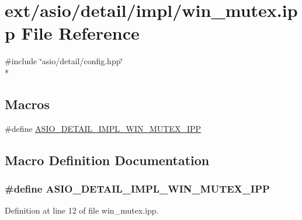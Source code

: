 \hypertarget{win__mutex_8ipp}{}\section{ext/asio/detail/impl/win\+\_\+mutex.ipp File Reference}
\label{win__mutex_8ipp}
{\ttfamily \#include \char`\"{}asio/detail/config.\+hpp\char`\"{}}\\*
\subsection*{Macros}
\begin{DoxyCompactItemize}
\item 
\#define \hyperlink{win__mutex_8ipp_afff9debcf1cfaa5cec0a749e4d0e3d02}{A\+S\+I\+O\+\_\+\+D\+E\+T\+A\+I\+L\+\_\+\+I\+M\+P\+L\+\_\+\+W\+I\+N\+\_\+\+M\+U\+T\+E\+X\+\_\+\+I\+P\+P}
\end{DoxyCompactItemize}


\subsection{Macro Definition Documentation}
\hypertarget{win__mutex_8ipp_afff9debcf1cfaa5cec0a749e4d0e3d02}{}
\subsubsection[{A\+S\+I\+O\+\_\+\+D\+E\+T\+A\+I\+L\+\_\+\+I\+M\+P\+L\+\_\+\+W\+I\+N\+\_\+\+M\+U\+T\+E\+X\+\_\+\+I\+P\+P}]{\setlength{\rightskip}{0pt plus 5cm}\#define A\+S\+I\+O\+\_\+\+D\+E\+T\+A\+I\+L\+\_\+\+I\+M\+P\+L\+\_\+\+W\+I\+N\+\_\+\+M\+U\+T\+E\+X\+\_\+\+I\+P\+P}\label{win__mutex_8ipp_afff9debcf1cfaa5cec0a749e4d0e3d02}


Definition at line 12 of file win\+\_\+mutex.\+ipp.

